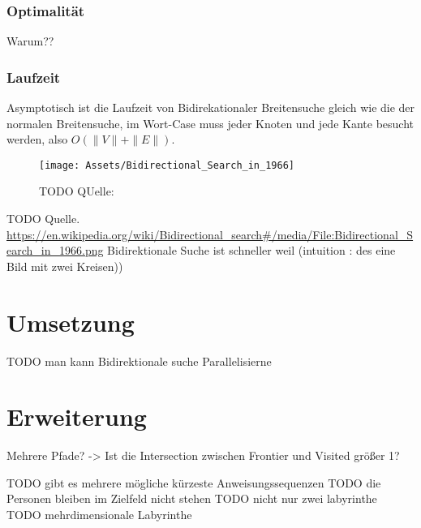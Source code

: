 \documentclass[a4paper,10pt,ngerman]{scrartcl}
\begin{document}
\subsubsection{Optimalität}
Warum??

\subsubsection{Laufzeit}
Asymptotisch ist die Laufzeit von Bidirekationaler Breitensuche gleich wie die der normalen Breitensuche, im Wort-Case muss jeder Knoten und jede Kante besucht werden, also $O(\|V\| + \|E\|)$.


\begin{figure}
  \centering
  \texttt{[image: Assets/Bidirectional\_Search\_in\_1966]}
  \caption {TODO QUelle: }
\end{figure}
TODO Quelle. \url{https://en.wikipedia.org/wiki/Bidirectional_search#/media/File:Bidirectional_Search_in_1966.png}
Bidirektionale Suche ist schneller weil (intuition : des eine Bild mit zwei Kreisen))



\section{Umsetzung}

TODO man kann Bidirektionale suche Parallelisierne


\section{Erweiterung}
Mehrere Pfade? -> Ist die Intersection zwischen Frontier und Visited größer 1?


TODO gibt es mehrere mögliche kürzeste Anweisungssequenzen
TODO die Personen bleiben im Zielfeld nicht stehen
TODO nicht nur zwei labyrinthe
TODO mehrdimensionale Labyrinthe
\end{document}

